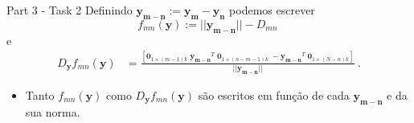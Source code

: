 \documentclass{beamer}					%
\begin{document}

\begin{frame}{Part 3  - Task 2}
	Definindo $\mathbf{y_{m-n}}:=\mathbf{y_m}-\mathbf{y_n}$ podemos escrever 
	\begin{equation*}\label{eq:deff}
	f_{mn}(\mathbf{y}) := ||\mathbf{y_{m-n}}||-D_{mn}\:
	\end{equation*}
	e 
	\begin{equation*}\label{key}
	\begin{split}
	D_{\mathbf{y}}f_{mn}(\mathbf{y}) &=\frac{\left[\mathbf{0}_{1\times(m-1)k} \;  \mathbf{y_{m-n}}^T \; \mathbf{0}_{1\times(n-m-1)k} \; -\mathbf{y_{m-n}}^T \; \mathbf{0}_{1\times(N-n)k}  \right]}{||\mathbf{y_{m-n}}||}\:.
	\end{split}
	\end{equation*}
	\begin{itemize}
		\item Tanto $f_{mn}(\mathbf{y})$ como $D_{\mathbf{y}}f_{mn}(\mathbf{y})$ são escritos em função de cada $\mathbf{y_{m-n}}$ e da sua norma.
	\end{itemize}
\end{frame}
\end{document}
